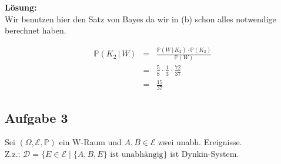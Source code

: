 \documentclass[11pt,a4paper,ngerman]{article}
\newcommand{\set}[1]{ \{ #1 \}}
\newcommand{\Prob}{\mathbb{P}}
\newcommand{\Epsilon}{\mathcal{E}}
\begin{document}
\textbf{Lösung:}\\

Wir benutzen hier den Satz von Bayes da wir in (b) schon alles notwendige berechnet haben.

\[
    \begin{array}{rcl}
        \Prob( K_2 \, | \, W) &=& \frac{\Prob(W \, | \, K_2) \cdot \Prob(K_2)}{\Prob(W)}\\
            &=& \frac{5}{8} \cdot \frac{1}{3} \cdot \frac{72}{37}\\
            &=& \frac{15}{37}
    \end{array}
\]

\subsection*{Aufgabe 3}
\newcommand{\D}{\mathcal{D}}
Sei $(\Omega, \Epsilon, \Prob)$ ein W-Raum und $A,B \in \Epsilon$ zwei unabh. Ereignisse. \\
Z.z.: $\mathcal{D} = \set{E \in \Epsilon \; | \; \set{A,B, E} \text{ ist unabhängig}}$ ist Dynkin-System. \\
\end{document}
